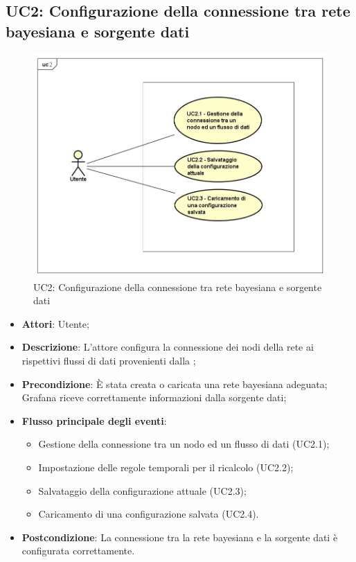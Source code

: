 \subsection{UC2: Configurazione della connessione tra rete bayesiana e sorgente dati}
\begin{figure} [H]
	\centering
	\includegraphics[scale=0.45]{Img/UC2}
	\caption{UC2: Configurazione della connessione tra rete bayesiana e sorgente dati}\label{}
\end{figure}
\begin{itemize}
	\item \textbf{Attori}: Utente;
	\item \textbf{Descrizione}: L'attore configura la connessione dei nodi della rete ai rispettivi flussi di dati provenienti dalla ;
	\item \textbf{Precondizione}: È stata creata o caricata una rete bayesiana adeguata; Grafana riceve correttamente informazioni dalla sorgente dati;
	\item \textbf{Flusso principale degli eventi}:
	\begin{itemize}
		\item Gestione della connessione tra un nodo ed un flusso di dati (UC2.1);
		\item Impostazione delle regole temporali per il ricalcolo (UC2.2);
		\item Salvataggio della configurazione attuale (UC2.3);
		\item Caricamento di una configurazione salvata (UC2.4).
	\end{itemize}
	\item \textbf{Postcondizione}: La connessione tra la rete bayesiana e la sorgente dati è configurata correttamente.
\end{itemize}

